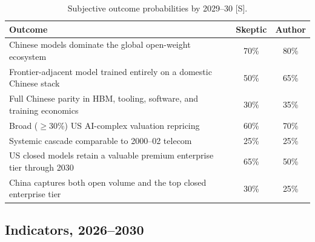 \begin{table}[htbp]
  \centering
  \small
  \caption{Subjective outcome probabilities by 2029--30 [S].}
  \label{tab:probs}
  \begin{tabular}{p{86mm}cc}
    \toprule
    Outcome & Skeptic & Author \\
    \midrule
    Chinese models dominate the global open-weight ecosystem & 70\% & 80\% \\
    Frontier-adjacent model trained entirely on a domestic Chinese stack & 50\% & 65\% \\
    Full Chinese parity in HBM, tooling, software, and training economics & 30\% & 35\% \\
    Broad ($\geq$30\%) US AI-complex valuation repricing & 60\% & 70\% \\
    Systemic cascade comparable to 2000--02 telecom & 25\% & 25\% \\
    US closed models retain a valuable premium enterprise tier through 2030 & 65\% & 50\% \\
    China captures both open volume and the top closed enterprise tier & 30\% & 25\% \\
    \bottomrule
  \end{tabular}
\end{table}

\subsection{Indicators, 2026--2030}

